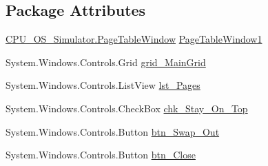 \subsection*{Package Attributes}
\begin{DoxyCompactItemize}
\item 
\hyperlink{class_c_p_u___o_s___simulator_1_1_page_table_window}{C\+P\+U\+\_\+\+O\+S\+\_\+\+Simulator.\+Page\+Table\+Window} \hyperlink{class_c_p_u___o_s___simulator_1_1_page_table_window_ac72a468cc382de9caf8ccac13b35d755}{Page\+Table\+Window1}
\item 
System.\+Windows.\+Controls.\+Grid \hyperlink{class_c_p_u___o_s___simulator_1_1_page_table_window_a980885f948a6f104858d19fdf45811b1}{grid\+\_\+\+Main\+Grid}
\item 
System.\+Windows.\+Controls.\+List\+View \hyperlink{class_c_p_u___o_s___simulator_1_1_page_table_window_ae057c5b521dd61e965fb1cd7643db659}{lst\+\_\+\+Pages}
\item 
System.\+Windows.\+Controls.\+Check\+Box \hyperlink{class_c_p_u___o_s___simulator_1_1_page_table_window_ab0e68128fbf4eb0e840d0d6179517e0f}{chk\+\_\+\+Stay\+\_\+\+On\+\_\+\+Top}
\item 
System.\+Windows.\+Controls.\+Button \hyperlink{class_c_p_u___o_s___simulator_1_1_page_table_window_ae8b5191737208bc156dea5312230c716}{btn\+\_\+\+Swap\+\_\+\+Out}
\item 
System.\+Windows.\+Controls.\+Button \hyperlink{class_c_p_u___o_s___simulator_1_1_page_table_window_ab50f72dcb40e44d6eadb0128c67eace6}{btn\+\_\+\+Close}
\end{DoxyCompactItemize}
